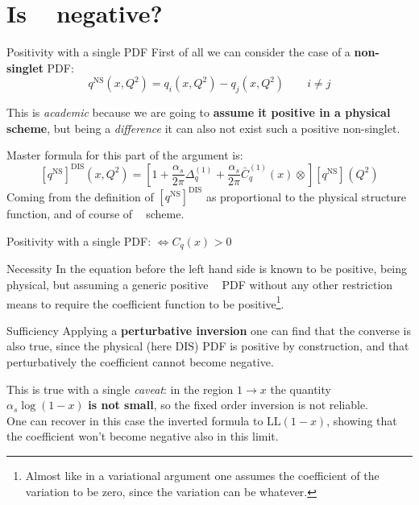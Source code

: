 \documentclass[9pt]{beamer}
\DeclareMathOperator{\msbar}{\overline{MS}}
\begin{document}
\section{Is $\msbar$ negative?}
\begin{frame}{Positivity with a single PDF}
    First of all we can consider the case of a \textbf{non-singlet} PDF:
    \begin{equation*}
        q^{\text{NS}}(x, Q^2) = q_i(x, Q^2) - q_j(x, Q^2) \qquad i \neq j
    \end{equation*}
    
    This is \textit{academic} because we are going to \textbf{assume it
    positive in a physical scheme}, but being a \textit{difference} it can also
    not exist such a positive non-singlet.

    \vspace*{15pt}
    Master formula for this part of the argument is:
    \begin{equation*}
        \left[{q^{\text{NS}}}\right]^{\text{DIS}}(x,Q^2)=
        \left[1+\frac{\alpha_s}{2\pi} {\Delta^{(1)}_q}^{\msbar}
        +\frac{\alpha_s}{2\pi}  {\bar
        C^{(1)}_q(x)}^{\msbar}\otimes\right]\left[{q^{\text{NS}}}\right]^{\msbar}(Q^2)
    \end{equation*}
    Coming from the definition of $\left[{q^{\text{NS}}}\right]^{\text{DIS}}$
    as proportional to the physical structure function, and of course of
    $\msbar$ scheme.
\end{frame}

\begin{frame}{Positivity with a single PDF: $\iff C_q(x)^{\msbar} > 0$}
    \begin{block}{Necessity}
        In the equation before the left hand side is known to be positive,
        being physical, but assuming a generic positive $\msbar$ PDF without
        any other restriction means to require the coefficient function to be
        positive\footnote{Almost like in a variational argument one assumes the
        coefficient of the variation to be zero, since the variation can be
        whatever.}.
    \end{block}
    \vspace*{10pt}
    \begin{block}{Sufficiency}
        Applying a \textbf{perturbative inversion} one can find that the
        converse is also true, since the physical (here $\text{DIS}$) PDF is
        positive by construction, and that perturbatively the coefficient
        cannot become negative.

        This is true with a single \textit{caveat}: in the region $1 \to x$ the
        quantity $\alpha_s\log(1-x)$ \textbf{is not small}, so the fixed order
        inversion is not reliable.\\
        One can recover in this case the inverted formula to $\text{LL}(1-x)$,
        showing that the coefficient won't become negative also in this limit.
    \end{block}
    \vspace*{10pt}
\end{frame}
\end{document}
